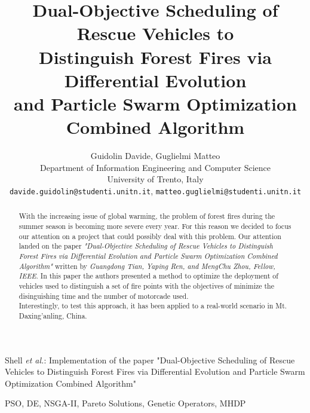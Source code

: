 \documentclass[journal]{IEEEtran}
\begin{document}

\title{Dual-Objective Scheduling of Rescue Vehicles to\\
Distinguish Forest Fires via Differential Evolution\\
and Particle Swarm Optimization\\
Combined Algorithm}

\author{Guidolin Davide,
        Guglielmi Matteo\\Department of Information Engineering and Computer Science\\University of Trento, Italy\\
\texttt{davide.guidolin@studenti.unitn.it}, \texttt{matteo.guglielmi@studenti.unitn.it}}%

%
{Shell \MakeLowercase{\textit{et al.}}: Implementation of the paper "Dual-Objective Scheduling of Rescue Vehicles to 
Distinguish Forest Fires via Differential Evolution
and Particle Swarm Optimization
Combined Algorithm"}
\maketitle

\begin{abstract}
With the increasing issue of global warming, the problem of forest fires during the summer season is becoming more severe every year.
For this reason we decided to focus our attention on a project that could possibly deal with this problem. Our attention landed on the paper 
\textit{"Dual-Objective Scheduling of Rescue Vehicles to Distinguish Forest Fires via Differential Evolution and Particle Swarm Optimization Combined Algorithm"}
written by \textit{Guangdong Tian, Yaping Ren, and MengChu Zhou, Fellow, IEEE}. 
In this paper the authors presented a method to optimize the deployment of vehicles used to distinguish a set of fire points with the objectives of minimize the disinguishing time and the number of motorcade used. \\
Interestingly, to test this approach, it has been applied to a real-world scenario in Mt. Daxing’anling, China.\\
\end{abstract}

\begin{IEEEkeywords}
    PSO, DE, NSGA-II, Pareto Solutions, Genetic Operators, MHDP
\end{IEEEkeywords}

\IEEEpeerreviewmaketitle










\end{document}

